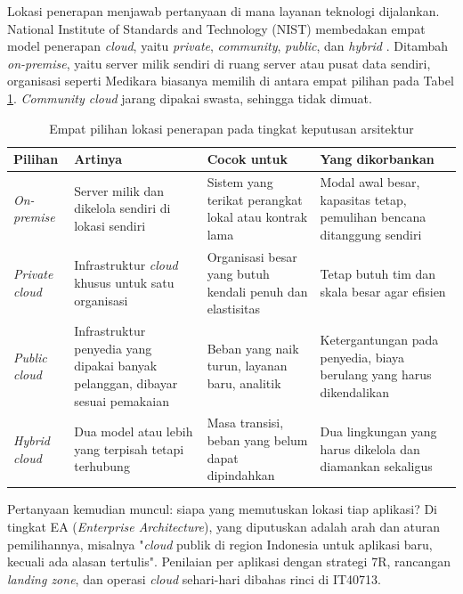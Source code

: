 Lokasi penerapan menjawab pertanyaan di mana layanan teknologi dijalankan.
National Institute of Standards and Technology (NIST) membedakan empat model
penerapan \textit{cloud}, yaitu \textit{private}, \textit{community},
\textit{public}, dan \textit{hybrid} \cite{nist800-145}. Ditambah
\textit{on-premise}, yaitu server milik sendiri di ruang server atau pusat data
sendiri, organisasi seperti Medikara biasanya memilih di antara empat pilihan
pada Tabel \ref{tab:ch10-lokasi}. \textit{Community cloud} jarang dipakai
swasta, sehingga tidak dimuat.

\begin{table}[!htb]
  \centering
  \caption{Empat pilihan lokasi penerapan pada tingkat keputusan arsitektur}
  \label{tab:ch10-lokasi}
  \small
  \begin{tabularx}{\textwidth}{lXXX}
    \hline
    \textbf{Pilihan} & \textbf{Artinya} & \textbf{Cocok untuk} & \textbf{Yang dikorbankan} \\
    \hline
    \textit{On-premise} & Server milik dan dikelola sendiri di lokasi sendiri &
      Sistem yang terikat perangkat lokal atau kontrak lama &
      Modal awal besar, kapasitas tetap, pemulihan bencana ditanggung sendiri \\
    \hline
    \textit{Private cloud} & Infrastruktur \textit{cloud} khusus untuk satu organisasi &
      Organisasi besar yang butuh kendali penuh dan elastisitas &
      Tetap butuh tim dan skala besar agar efisien \\
    \hline
    \textit{Public cloud} & Infrastruktur penyedia yang dipakai banyak pelanggan, dibayar sesuai pemakaian &
      Beban yang naik turun, layanan baru, analitik &
      Ketergantungan pada penyedia, biaya berulang yang harus dikendalikan \\
    \hline
    \textit{Hybrid cloud} & Dua model atau lebih yang terpisah tetapi terhubung &
      Masa transisi, beban yang belum dapat dipindahkan &
      Dua lingkungan yang harus dikelola dan diamankan sekaligus \\
    \hline
  \end{tabularx}
\end{table}

Pertanyaan kemudian muncul: siapa yang memutuskan lokasi tiap aplikasi? Di
tingkat EA (\textit{Enterprise Architecture}), yang diputuskan adalah arah dan
aturan pemilihannya, misalnya "\textit{cloud} publik di region Indonesia
untuk aplikasi baru, kecuali ada alasan tertulis". Penilaian per aplikasi
dengan strategi 7R, rancangan \textit{landing zone}, dan operasi \textit{cloud}
sehari-hari dibahas rinci di IT40713.

